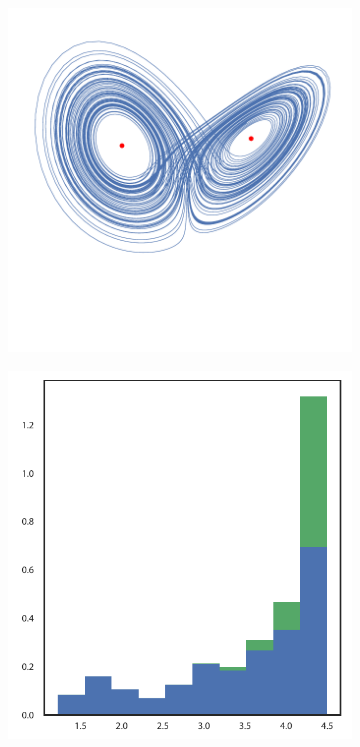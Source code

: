 \begin{figure}[h!]
    \centering
    \begin{subfigure}[t]{0.15\textwidth}
\centering
\includegraphics[scale=0.19]{lorenz/lorenz_attractor.pdf}
\end{subfigure}
    \begin{subfigure}[t]{0.15\textwidth}
\centering
\includegraphics[scale=0.22]{lorenz/real_space.pdf}

\end{subfigure}
\end{figure}

